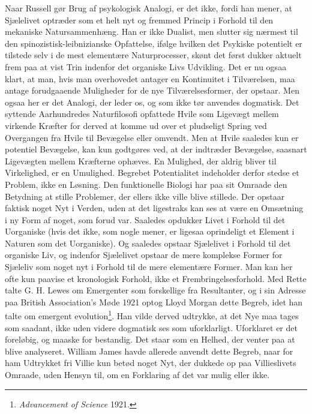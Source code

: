 \documentclass[12pt]{article}
\newcommand{\opage}[1]{\marginnote{\footnotesize\textit{[#1]}}}
\begin{document}
Naar Russell gør Brug af psykologisk Analogi, er det ikke, fordi han
mener, at Sjælelivet optræder som et helt nyt og fremmed Princip i
Forhold til den mekaniske Natursammenhæng. Han er ikke Dualist, men
slutter sig nærmest til den spinozistisk-leibnizianske Opfattelse,
ifølge hvilken det Psykiske potentielt er tilstede selv i de mest
elementære Naturprocesser, skønt det først dukker aktuelt frem paa
at vist Trin indenfor det organiske Livs Udvikling. Det er nu ogsaa
klart, at man, hvis man overhovedet antager en Kontinuitet i
Tilværelsen, maa antage forudgaaende Muligheder for de nye
Tilværelsesformer, der opstaar. Men ogsaa her er det Analogi, der leder
os, og som ikke tør anvendes dogmatisk. Det syttende Aarhundredes
Naturfilosofi opfattede Hvile som Ligevægt mellem virkende Kræfter for
derved at komme ud over et pludseligt Spring ved Overgangen fra Hvile
til Bevægelse eller omvendt. Men at Hvile saaledes kun er potentiel
Bevægelse, kan kun godtgøres ved, at der indtræder Bevægelse, saasnart
Ligevægten mellem Kræfterne ophæves. En Mulighed, der aldrig bliver til
Virkelighed, er en Umulighed. Begrebet Potentialitet indeholder derfor
stedse et Problem,
\setcounter{footnote}{0}%
\opage{30}ikke en Løsning. Den funktionelle Biologi har paa sit Omraade
den Betydning at stille Problemer, der ellers ikke ville blive stillede.
Der opstaar faktisk noget Nyt i Verden, uden at det ligestraks kan ses
at være en Omsætning i ny Form af noget, som forud var. Saaledes
opdukker Livet i Forhold til det Uorganiske (hvis det ikke, som nogle
mener, er ligesaa oprindeligt et Element i Naturen som det
Uorganiske). Og saaledes opstaar Sjælelivet i Forhold til det
organiske Liv, og indenfor Sjælelivet opstaar de mere komplekse Former
for Sjæleliv som noget nyt i Forhold til de mere elementære Former. Man
kan her ofte kun paavise et kronologisk Forhold, ikke et
Frembringelsesforhold. Med Rette talte G. H. Lewes om Emergenter som
forskellige fra Resultanter, og i sin Adresse paa British
Association's Møde 1921 optog Lloyd Morgan dette Begreb, idet han talte
om \guillemotright{}emergent evolution\guillemotleft{}\footnote{\textit{Advancement of
Science} 1921.}. Han vilde derved udtrykke, at det Nye maa tages som
saadant, ikke uden videre dogmatisk ses som uforklarligt. Uforklaret er
det foreløbig, og maaske for bestandig. Det staar som en Helhed, der
venter paa at blive analyseret. William James havde allerede anvendt
dette Begreb, naar for ham Udtrykket \guillemotright{}fri Villie\guillemotleft{} kun betød
noget Nyt, der dukkede op paa Villieslivets Omraade, uden Hensyn til,
om en Forklaring af det var mulig eller ikke.
\end{document}

